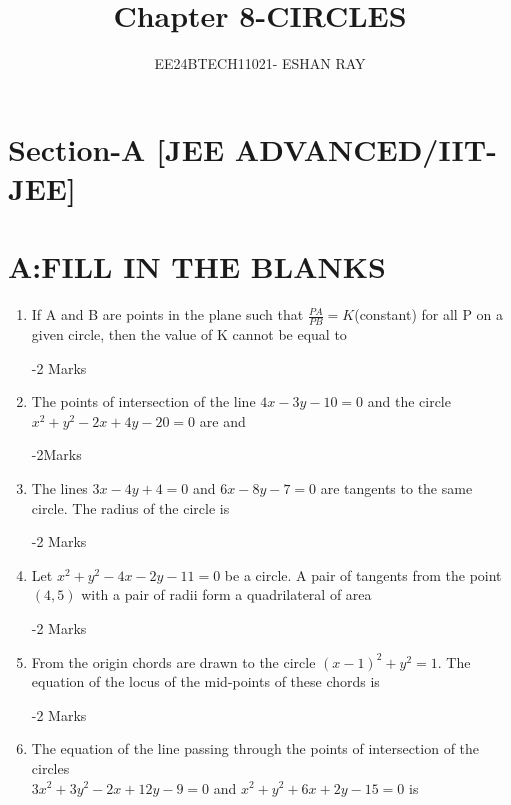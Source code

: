 \documentclass[journal,12pt,twocolumn]{IEEEtran}
\theoremstyle{remark}
\begin{document}

\vspace{3cm}

\title{Chapter 8-CIRCLES}
\author{EE24BTECH11021- ESHAN RAY}
\maketitle
\newpage
\bigskip
\section*{Section-A [JEE ADVANCED/IIT-JEE]}
\section*{A:FILL IN THE BLANKS}
\begin{enumerate}
    

	\item If A and B are points in the plane such that        $\frac{PA}{PB}=K$(constant) for all P on a given circle, then the value of K cannot be equal to \dotuline{\hspace{3cm}}

\hfill{-2 Marks} 
\item The points of intersection of the line $4x-3y-10=0$ and the circle $x^{2}+y^{2}-2x+4y-20=0$ are \dotuline{\hspace{3cm}} and \dotuline{\hspace{3cm}}   

\hfill{-2Marks}
\item The lines $3x-4y+4=0$ and $6x-8y-7=0$ are tangents to the same circle. The radius of the circle is \dotuline{\hspace{3cm}} 

\hfill{-2 Marks}
\item Let $x^{2}+y^{2}-4x-2y-11=0$ be a circle. A pair of tangents from the point $(4,5)$ with a pair of radii form a quadrilateral of area \dotuline{\hspace{3cm}} 

\hfill{-2 Marks}
\item From the origin chords are drawn  to the circle $(x-1)^{2}+y^{2}=1$. The equation of the locus of the mid-points of these chords is \dotuline{\hspace{3cm}}

\hfill{-2 Marks}
\item The equation of the line passing through the points of intersection of the circles\\ $3x^{2}+3y^{2}-2x+12y-9=0$ and $x^{2}+y^{2}+6x+2y-15=0$ is \dotuline{\hspace{3cm}}


\end{enumerate}
\end{document}
